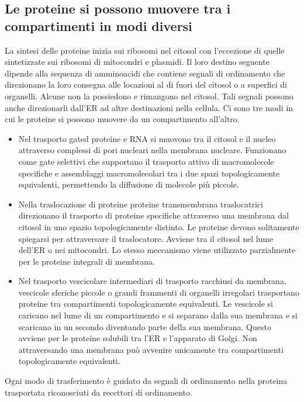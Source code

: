 \subsection{Le proteine si possono muovere tra i compartimenti in modi diversi}
La sintesi delle proteine inizia sui ribosomi nel citosol con l'eccezione di quelle sintetizzate sui ribosomi di mitocondri e plasmidi. Il loro destino seguente dipende alla sequenza
di amminoacidi che contiene segnali di ordinamento che direzionano la loro consegna alle locazioni al di fuori del citosol o a superfici di organelli. Alcune non la possiedono e 
rimangono nel citosol. Tali segnali possono anche direzionarli dall'ER ad altre destinazioni nella cellula. Ci sono tre modi in cui le proteine si possono muovere da un compartimento 
all'altro.
\begin{itemize}
	\item Nel trasporto gated proteine e RNA si muovono tra il citosol e il nucleo attraverso complessi di pori nucleari nella membrana nucleare. Funzionano come 
		gate selettivi che supportano il trasporto attivo di macromolecole specifiche e assemblaggi macromolecolari tra i due spazi topologicamente equivalenti, permettendo la
		diffusione di molecole pi\`u piccole.
	\item Nella traslocazione di proteine proteine transmembrana traslocatrici direzionano il trasporto di proteine specifiche attraverso una membrana dal citosol in uno spazio 
		topologicamente distinto. Le proteine devono solitamente spiegarsi per attraversare il traslocatore. Avviene tra il citosol nel lume dell'ER o nei mitocondri. Lo 
		stesso meccanismo viene utilizzato parzialmente per le proteine integrali di membrana.
	\item Nel trasporto vescicolare intermediari di trasporto racchiusi da membrana, vescicole sferiche piccole o grandi frammenti di organelli irregolari trasportano proteine tra
		compartimenti topologicamente equivalenti. Le vescicole si caricano nel lume di un compartimento e si separano dalla sua membrana e si scaricano in un secondo diventando
		parte della sua membrana. Questo avviene per le proteine solubili tra l'ER e l'apparato di Golgi. Non attraversando una membrana pu\`o avvenire unicamente tra 
		compartimenti topologicamente equivalenti.
\end{itemize}
Ogni modo di trasferimento \`e guidato da segnali di ordinamento nella proteina trasportata riconosciuti da recettori di ordinamento. 
